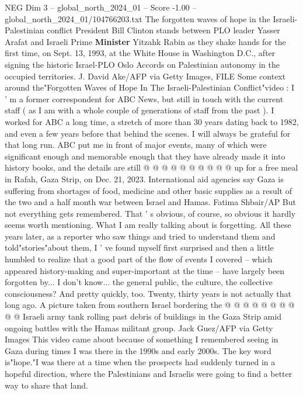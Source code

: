 \begin{textsample}{NEG Dim 3 – global\_north\_2024\_01 – Score -1.00 – global\_north\_2024\_01/104766203.txt}  \label{ex:f3_neg_213}
The forgotten waves of hope in the Israeli-Palestinian conflict President Bill Clinton stands between PLO leader Yasser Arafat and Israeli Prime \textbf{Minister} Yitzahk Rabin as they shake hands for the first time, on Sept. 13, 1993, at the White House in Washington D.C., after signing the historic Israel-PLO Oslo Accords on Palestinian autonomy in the occupied territories.
J.
David Ake/AFP via Getty Images, FILE Some context around the"Forgotten Waves of Hope In The Israeli-Palestinian Conflict"video : I ' m a former correspondent for ABC News, but still in touch with the current staff ( as I am with a whole couple of generations of staff from the past ).
I worked for ABC a long time, a stretch of more than 30 years dating back to 1982, and even a few years before that behind the scenes.
I will always be grateful for that long run.
ABC put me in front of major events, many of which were significant enough and memorable enough that they have already made it into history books, and the details are still @ @ @ @ @ @ @ @ @ @ up for a free meal in Rafah, Gaza Strip, on Dec. 21, 2023.
International aid agencies say Gaza is suffering from shortages of food, medicine and other basic supplies as a result of the two and a half month war between Israel and Hamas.
Fatima Shbair/AP But not everything gets remembered.
That ' s obvious, of course, so obvious it hardly seems worth mentioning.
What I am really talking about is forgetting.
All these years later, as a reporter who saw things and tried to understand them and told"stories"about them, I ' ve found myself first surprised and then a little humbled to realize that a good part of the flow of events I covered -- which appeared history-making and super-important at the time -- have largely been forgotten by...
I don't know... the general public, the culture, the collective consciousness?
And pretty quickly, too.
Twenty, thirty years is not actually that long ago.
A picture taken from southern Israel bordering the @ @ @ @ @ @ @ @ @ @ Israeli army tank rolling past debris of buildings in the Gaza Strip amid ongoing battles with the Hamas militant group.
Jack Guez/AFP via Getty Images This video came about because of something I remembered seeing in Gaza during times I was there in the 1990s and early 2000s.
The key word is"hope."I was there at a time when the prospects had suddenly turned in a hopeful direction, where the Palestinians and Israelis were going to find a better way to share that land.

\end{textsample}
